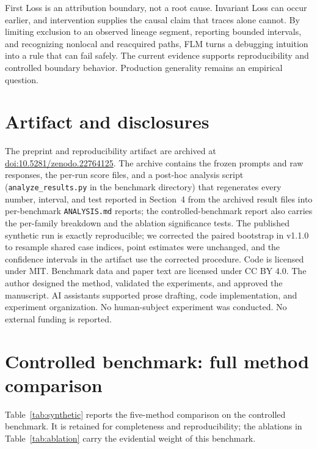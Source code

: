 \documentclass[10pt]{article}
\begin{document}
First Loss is an attribution boundary, not a root cause. Invariant Loss can occur earlier, and intervention supplies the causal claim that traces alone cannot. By limiting exclusion to an observed lineage segment, reporting bounded intervals, and recognizing nonlocal and reacquired paths, FLM turns a debugging intuition into a rule that can fail safely. The current evidence supports reproducibility and controlled boundary behavior. Production generality remains an empirical question.

\section*{Artifact and disclosures}

{\sloppypar
The preprint and reproducibility artifact are archived at \href{https://doi.org/10.5281/zenodo.22764125}{doi:10.5281/zenodo.22764125}. The archive contains the frozen prompts and raw responses, the per-run score files, and a post-hoc analysis script (\texttt{analyze\_results.py} in the benchmark directory) that regenerates every number, interval, and test reported in Section~4 from the archived result files into per-benchmark \texttt{ANALYSIS.md} reports; the controlled-benchmark report also carries the per-family breakdown and the ablation significance tests. The published synthetic run is exactly reproducible; we corrected the paired bootstrap in v1.1.0 to resample shared case indices, point estimates were unchanged, and the confidence intervals in the artifact use the corrected procedure. Code is licensed under MIT. Benchmark data and paper text are licensed under CC BY 4.0. The author designed the method, validated the experiments, and approved the manuscript. AI assistants supported prose drafting, code implementation, and experiment organization. No human-subject experiment was conducted. No external funding is reported.
\par}

\appendix
\section{Controlled benchmark: full method comparison}
\label{app:synthetic}

Table~\ref{tab:synthetic} reports the five-method comparison on the controlled benchmark. It is retained for completeness and reproducibility; the ablations in Table~\ref{tab:ablation} carry the evidential weight of this benchmark.
\end{document}
